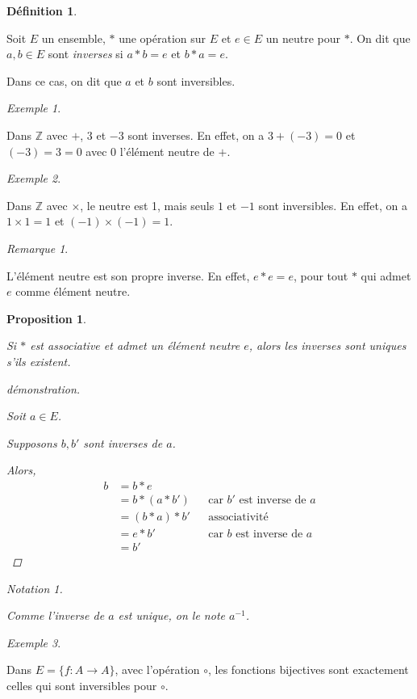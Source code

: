\documentclass{report}
\newtheorem*{prop}{Proposition}
\theoremstyle{definition}
\newtheorem*{defin}{D\'efinition}
\theoremstyle{remark}
\newtheorem*{exem}{Exemple}
\newtheorem*{nota}{Notation}
\newtheorem*{rema}{Remarque}
\begin{document}
	\begin{defin}
		~

		Soit $E$ un ensemble, $*$ une op\'eration sur $E$ et $e \in E$ un neutre pour $*$. On dit que $a,b \in E$ sont \emph{inverses} si $a*b=e$ et $b*a=e$.

		Dans ce cas, on dit que $a$ et $b$ sont inversibles.
	\end{defin}
	\begin{exem}
		~

		Dans $\mathbb{Z}$ avec $+$, $3$ et $-3$ sont inverses. En effet, on a $3+(-3)=0$ et $(-3)=3=0$ avec $0$ l'\'el\'ement neutre de $+$.
	\end{exem}
	\begin{exem}
		~

		Dans $\mathbb{Z}$ avec $\times$, le neutre est 1, mais seuls $1$ et $-1$ sont inversibles. En effet, on a $1 \times 1=1$ et $(-1) \times (-1)=1$.
	\end{exem}
	\begin{rema}
		~

		L'\'el\'ement neutre est son propre inverse. En effet, $e*e=e$, pour tout $*$ qui admet $e$ comme \'el\'ement neutre.
	\end{rema}
	\begin{prop}
		~

		Si $*$ est associative et admet un \'el\'ement neutre $e$, alors les inverses sont uniques s'ils existent.
		\begin{proof}[d\'emonstration]~

			Soit $a \in E$.

			Supposons $b,b'$ sont inverses de $a$.

			Alors,
			\begin{align*}
				b&=b*e\\
				&=b*(a*b')&&\text{car $b'$ est inverse de $a$}\\
				&=(b*a)*b'&&\text{associativit\'e}\\
				&=e*b'&&\text{car $b$ est inverse de $a$}\\
				&=b'
			\end{align*}
		\end{proof}
		\begin{nota}
			~

			Comme l'inverse de $a$ est unique, on le note $a^{-1}$.
		\end{nota}
	\end{prop}
	\begin{exem}
		~

		Dans $E=\{f:A \to A\}$, avec l'op\'eration $\circ$, les fonctions bijectives sont exactement celles qui sont inversibles pour $\circ$.
	\end{exem}
\end{document}
